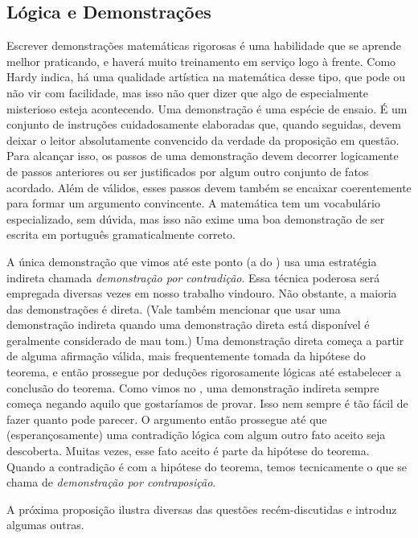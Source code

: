 \subsection{Lógica e Demonstrações}\label{subsec:logica-demonstracoes}

Escrever demonstrações matemáticas rigorosas é uma habilidade que se aprende melhor praticando, e haverá muito treinamento em serviço logo à frente. Como Hardy indica, há uma qualidade artística na matemática desse tipo, que pode ou não vir com facilidade, mas isso não quer dizer que algo de especialmente misterioso esteja acontecendo. Uma demonstração é uma espécie de ensaio. É um conjunto de instruções cuidadosamente elaboradas que, quando seguidas, devem deixar o leitor absolutamente convencido da verdade da proposição em questão. Para alcançar isso, os passos de uma demonstração devem decorrer logicamente de passos anteriores ou ser justificados por algum outro conjunto de fatos acordado. Além de válidos, esses passos devem também se encaixar coerentemente para formar um argumento convincente. A matemática tem um vocabulário especializado, sem dúvida, mas isso não exime uma boa demonstração de ser escrita em português gramaticalmente correto.

A única demonstração que vimos até este ponto (a do ) usa uma estratégia indireta chamada \textit{demonstração por contradição}. Essa técnica poderosa será empregada diversas vezes em nosso trabalho vindouro. Não obstante, a maioria das demonstrações é direta. (Vale também mencionar que usar uma demonstração indireta quando uma demonstração direta está disponível é geralmente considerado de mau tom.) Uma demonstração direta começa a partir de alguma afirmação válida, mais frequentemente tomada da hipótese do teorema, e então prossegue por deduções rigorosamente lógicas até estabelecer a conclusão do teorema. Como vimos no , uma demonstração indireta sempre começa negando aquilo que gostaríamos de provar. Isso nem sempre é tão fácil de fazer quanto pode parecer. O argumento então prossegue até que (esperançosamente) uma contradição lógica com algum outro fato aceito seja descoberta. Muitas vezes, esse fato aceito é parte da hipótese do teorema. Quando a contradição é com a hipótese do teorema, temos tecnicamente o que se chama de \textit{demonstração por contraposição}. 

A próxima proposição ilustra diversas das questões recém-discutidas e introduz algumas outras.

